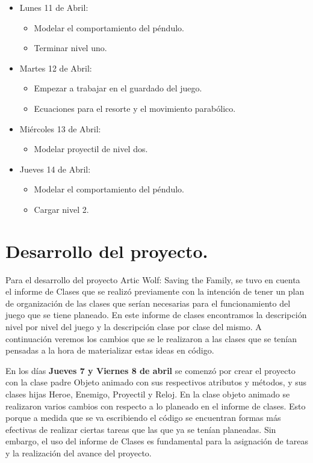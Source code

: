 \documentclass{article}
\begin{document}
\begin{itemize}
    \item Lunes 11 de Abril:
    \begin{itemize}
        \item Modelar el comportamiento del péndulo.
        \item Terminar nivel uno.
    \end{itemize}
    
    \item Martes 12 de Abril:
    \begin{itemize}
        \item Empezar a trabajar en el guardado del juego.
        \item Ecuaciones para el resorte y el movimiento parabólico.
    \end{itemize}
    
    \item Miércoles 13 de Abril:
    \begin{itemize}
        \item Modelar proyectil de nivel dos.
    \end{itemize}
    
    \item Jueves 14 de Abril:
    \begin{itemize}
        \item Modelar el comportamiento del péndulo.
        \item Cargar nivel 2.
    \end{itemize}
    
    
\end{itemize}

\section{Desarrollo del proyecto.}
Para el desarrollo del proyecto Artic Wolf: Saving the Family, se tuvo en cuenta el informe de Clases que se realizó previamente con la intención de tener un plan de organización de las clases que serían necesarias para el funcionamiento del juego que se tiene planeado. En este informe de clases encontramos la descripción nivel por nivel del juego y la descripción clase por clase del mismo. A continuación veremos los cambios que se le realizaron a las clases que se tenían pensadas a la hora de materializar estas ideas en código.

En los días \textbf{Jueves 7 y Viernes 8 de abril} se comenzó por crear el proyecto con la clase padre Objeto animado con sus respectivos atributos y métodos, y sus clases hijas Heroe, Enemigo, Proyectil y Reloj.
En la clase objeto animado se realizaron varios cambios con respecto a lo planeado en el informe de clases. Esto porque a medida que se va escribiendo el código se encuentran formas más efectivas de realizar ciertas tareas que las que ya se tenían planeadas. Sin embargo, el uso del informe de Clases es fundamental para la asignación de tareas y la realización del avance del proyecto.
\end{document}
